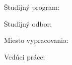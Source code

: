 


Študijný program: \myStudyProgram

Študijný odbor: \myDegreeCourse

Miesto vypracovania: \myInstitute

Vedúci práce: \mySupervisor

\medskip{}

\myDate


\newpage
\thispagestyle{empty}
\mbox{}
\newpage

